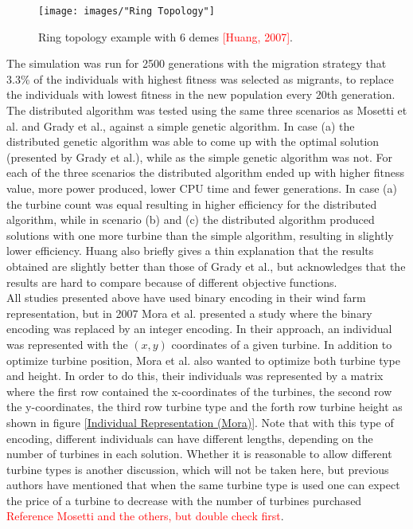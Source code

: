 \begin{figure}[h!]
\begin{center}
\texttt{[image: images/"Ring Topology"]}
\caption{Ring topology example with 6 demes \textcolor{red}{[Huang, 2007]}.}
\label{Ring Topology}
\end{center}
\end{figure}


\noindent The simulation was run for 2500 generations with the migration strategy that 3.3\% of the individuals with highest fitness was selected as migrants, to replace the individuals with lowest fitness in the new population every 20th generation. The distributed algorithm was tested using the same three scenarios as Mosetti et al. and Grady et al., against a simple genetic algorithm. In case (a) the distributed genetic algorithm was able to come up with the optimal solution (presented by Grady et al.), while as the simple genetic algorithm was not. For each of the three scenarios the distributed algorithm ended up with higher fitness value, more power produced, lower CPU time and fewer generations. In case (a) the turbine count was equal resulting in higher efficiency for the distributed algorithm, while in scenario (b) and (c) the distributed algorithm produced solutions with one more turbine than the simple algorithm, resulting in slightly lower efficiency. Huang also briefly gives a thin explanation that the results obtained are slightly better than those of Grady et al., but acknowledges that the results are hard to compare because of different objective functions.\\


All studies presented above have used binary encoding in their wind farm representation, but in 2007 Mora et al. presented a study where the binary encoding was replaced by an integer encoding. In their approach, an individual was represented with the $(x, y)$ coordinates of a given turbine. In addition to optimize turbine position, Mora et al. also wanted to optimize both turbine type and height. In order to do this, their individuals was represented by a matrix where the first row contained the x-coordinates of the turbines, the second row the y-coordinates, the third row turbine type and the forth row turbine height as shown in figure \ref{Individual Representation (Mora)}. Note that with this type of encoding, different individuals can have different lengths, depending on the number of turbines in each solution. Whether it is reasonable to allow different turbine types is another discussion, which will not be taken here, but previous authors have mentioned that when the same turbine type is used one can expect the price of a turbine to decrease with the number of turbines purchased \textcolor{red}{Reference Mosetti and the others, but double check first}. \\


